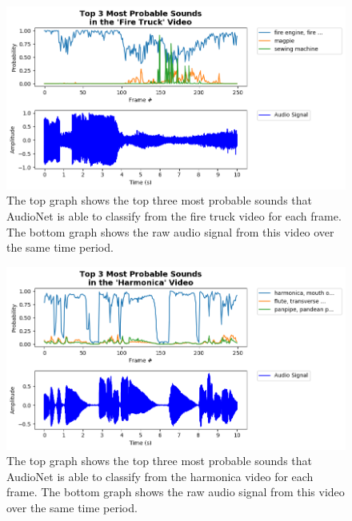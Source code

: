 \documentclass[12pt,twoside]{article}
\theoremstyle{plain}
\theoremstyle{definition}
\theoremstyle{remark}
\begin{document}
\begin{figure}[h]
   \centerline{\includegraphics[width=\textwidth]{inf_fire_truck.png}}
   {\caption{\footnotesize The top graph shows the top three most probable sounds that AudioNet is able to classify from the fire truck video for each frame.
             The bottom graph shows the raw audio signal from this video over the same time period.}
     \label{fig:inf_fire_truck}}
\end{figure}

\begin{figure}[h]
   \centerline{\includegraphics[width=\textwidth]{inf_harmonica.png}}
   {\caption{\footnotesize The top graph shows the top three most probable sounds that AudioNet is able to classify from the harmonica video for each frame.
             The bottom graph shows the raw audio signal from this video over the same time period.}
     \label{fig:inf_harmonica}}
\end{figure}
\end{document}
